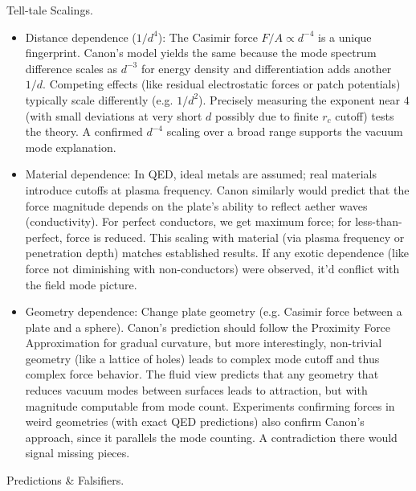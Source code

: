 \documentclass[11pt]{article}
\begin{document}
Tell-tale Scalings.


\begin{itemize}

\item 
Distance dependence ($1/d^4$): The Casimir force $F/A \propto d^{-4}$ is a unique fingerprint. Canon’s model yields the same because the mode spectrum difference scales as $d^{-3}$ for energy density and differentiation adds another $1/d$. Competing effects (like residual electrostatic forces or patch potentials) typically scale differently (e.g. $1/d^2$). Precisely measuring the exponent near $4$ (with small deviations at very short $d$ possibly due to finite $r_c$ cutoff) tests the theory. A confirmed $d^{-4}$ scaling over a broad range supports the vacuum mode explanation.




\item 
Material dependence: In QED, ideal metals are assumed; real materials introduce cutoffs at plasma frequency. Canon similarly would predict that the force magnitude depends on the plate’s ability to reflect aether waves (conductivity). For perfect conductors, we get maximum force; for less-than-perfect, force is reduced. This scaling with material (via plasma frequency or penetration depth) matches established results. If any exotic dependence (like force not diminishing with non-conductors) were observed, it’d conflict with the field mode picture.




\item 
Geometry dependence: Change plate geometry (e.g. Casimir force between a plate and a sphere). Canon’s prediction should follow the Proximity Force Approximation for gradual curvature, but more interestingly, non-trivial geometry (like a lattice of holes) leads to complex mode cutoff and thus complex force behavior. The fluid view predicts that any geometry that reduces vacuum modes between surfaces leads to attraction, but with magnitude computable from mode count. Experiments confirming forces in weird geometries (with exact QED predictions) also confirm Canon’s approach, since it parallels the mode counting. A contradiction there would signal missing pieces.




\end{itemize}

Predictions & Falsifiers.
\end{document}
